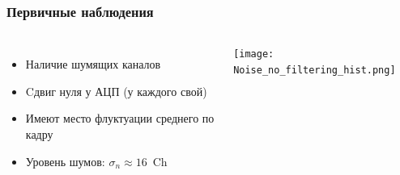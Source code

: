 \documentclass[14pt]{beamer}
\begin{document}
\begin{frame}[c]
\frametitle{Первичные наблюдения}
\vspace{10pt}
\begin{columns}
	\begin{minipage}[t][1\textheight]{\linewidth}
		\small{\begin{itemize}
				\item Наличие шумящих каналов
				\item Cдвиг нуля у АЦП (у каждого свой)
				\item Имеют место флуктуации среднего по кадру
				\item Уровень шумов: $\sigma_n \approx 16$~Ch
		\end{itemize}}
	\end{minipage}%
	\begin{minipage}[t][1\textheight]{\linewidth}
		\vspace*{21pt}
		\hspace*{5pt}
        \texttt{[image: Noise\_no\_filtering\_hist.png]}
	\end{minipage}
\end{columns}
\end{frame}
\end{document}
